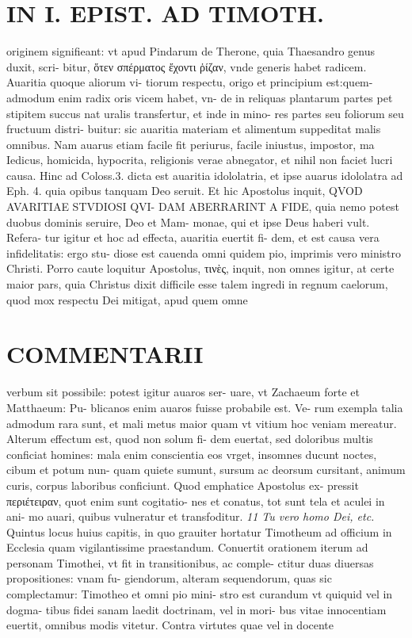 \documentclass{article}
\begin{document}
\begin{pages}
\section*{IN I. EPIST. AD TIMOTH. }
\marginpar{[ p.157 ]}\pstart originem signifieant: vt apud Pindarum de Therone, quia Thaesandro genus duxit, scri- bitur, ὅτεν σπέρματος ἔχοντι ῥίζαν, vnde generis habet radicem. Auaritia quoque aliorum vi- tiorum respectu, origo et principium est:quem- admodum enim radix oris vicem habet, vn- de in reliquas plantarum partes pet stipitem succus nat uralis transfertur, et inde in mino- res partes seu foliorum seu fructuum distri- buitur: sic auaritia materiam et alimentum suppeditat malis omnibus. Nam auarus etiam facile fit periurus, facile iniustus, impostor, ma Iedicus, homicida, hypocrita, religionis verae abnegator, et nihil non faciet lucri causa. Hinc ad Coloss.3. dicta est auaritia idololatria, et ipse auarus idololatra ad Eph. 4. quia opibus tanquam Deo seruit. Et hic Apostolus inquit, QVOD AVARITIAE STVDIOSI QVI- DAM ABERRARINT A FIDE, quia nemo potest duobus dominis seruire, Deo et Mam- monae, qui et ipse Deus haberi vult. Refera- tur igitur et hoc ad effecta, auaritia euertit fi- dem, et est causa vera infidelitatis: ergo stu- diose est cauenda omni quidem pio, imprimis vero ministro Christi. Porro caute loquitur Apostolus, τινὲς, inquit, non omnes igitur, at certe maior pars, quia Christus dixit difficile esse talem ingredi in regnum caelorum, quod mox respectu Dei mitigat, apud quem omne  \pend
\marginpar{[ p.158 ]}
\section*{COMMENTARII }\pstart verbum sit possibile: potest igitur auaros ser- uare, vt Zachaeum forte et Matthaeum: Pu- blicanos enim auaros fuisse probabile est. Ve- rum exempla talia admodum rara sunt, et mali metus maior quam vt vitium hoc veniam mereatur.  \pend\pstart Alterum effectum est, quod non solum fi- dem euertat, sed doloribus multis conficiat homines: mala enim conscientia eos vrget, insomnes ducunt noctes, cibum et potum nun- quam quiete sumunt, sursum ac deorsum cursitant, animum curis, corpus laboribus conficiunt. Quod emphatice Apostolus ex- pressit περιέτειραν, quot enim sunt cogitatio- nes et conatus, tot sunt tela et aculei in ani- mo auari, quibus vulneratur et transfoditur.  \pend
\textit{11 Tu vero homo Dei, etc. }\pstart Quintus locus huius capitis, in quo grauiter hortatur Timotheum ad officium in Ecclesia quam vigilantissime praestandum. Conuertit orationem iterum ad personam Timothei, vt fit in transitionibus, ac comple- ctitur duas diuersas propositiones: vnam fu- giendorum, alteram sequendorum, quas sic complectamur: Timotheo et omni pio mini- stro est curandum vt quiquid vel in dogma- tibus fidei sanam laedit doctrinam, vel in mori- bus vitae innocentiam euertit, omnibus modis vitetur. Contra virtutes quae vel in docente  \pend

\end{pages}
\end{document}

